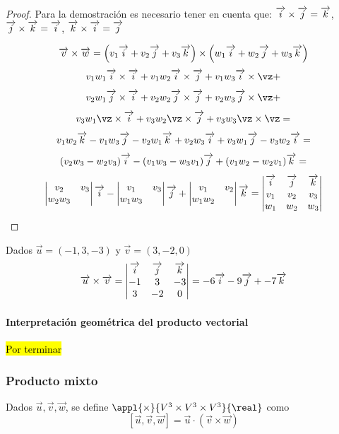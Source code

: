 \begin{proof}

Para la demostración es necesario tener en cuenta que: $\overrightarrow{i}\times\overrightarrow{j}=\overrightarrow{k}$, $\overrightarrow{j}\times\overrightarrow{k}=\overrightarrow{i}$, $\overrightarrow{k}\times\overrightarrow{i}=\overrightarrow{j}$

\[
\overrightarrow{v}\times\overrightarrow{w} = \left(v_1\overrightarrow{i}+v_2\overrightarrow{j}+v_3\overrightarrow{k}\right)\times\left(w_1\overrightarrow{i}+w_2\overrightarrow{j}+w_3\overrightarrow{k}\right)\]
\[
v_1w_1\vi\times\vi+v_1w_2\vi\times\vj+v_1w_3\vi\times\vz+\]\[
v_2w_1\vj\times\vi+v_2w_2\vj\times\vj+v_2w_3\vj\times\vz+\]\[
v_3w_1\vz\times\vi+v_3w_2\vz\times\vj+v_3w_3\vz\times\vz=
\]
\[
v_1w_2\overrightarrow{k}-v_1w_3\overrightarrow{j}-v_2w_1\overrightarrow{k}+v_2w_3\overrightarrow{i}+v_3w_1\overrightarrow{j}-v_3w_2\overrightarrow{i} = \]\[
(v_2w_3-w_2v_3)\overrightarrow{i} -(v_1w_3-w_3v_1)\overrightarrow{j}+ (v_1w_2-w_2v_1)\overrightarrow{k} = 
\]
\[
\left|\begin{matrix}v_2&v_3\\w_2w_3\end{matrix}\right|\overrightarrow{i} - 
\left|\begin{matrix}v_1&v_3\\w_1w_3\end{matrix}\right|\overrightarrow{j} +
\left|\begin{matrix}v_1&v_2\\w_1w_2\end{matrix}\right|\overrightarrow{k} = \left|\begin{matrix}\overrightarrow{i}&\overrightarrow{j}&\overrightarrow{k}\\v_1&v_2&v_3\\w_1&w_2&w_3\end{matrix}\right|
\]
\end{proof}


\begin{example}
Dados $\vec{u}=(-1,3,-3)$ y $\vec{v} = (3,-2,0)$
\[
\vec{u}\times\vec{v} = \crossprod{-1}{3}{-3}{3}{-2}{0} =\crossprodcalc{-1}{3}{-3}{3}{-2}{0}
\]
\end{example}

\paragraph{Interpretación geométrica del producto vectorial}

\hl{Por terminar}

\subsubsection{Producto mixto}
\begin{defn}
Dados $\vec{u},\vec{v},\vec{w}$, se define $\appl{\times}{V^3\times V^3\times V^3}{\real}$ como 
\[\left[\vec{u},\vec{v},\vec{w}\right] = \vec{u}·\left(\vec{v}\times\vec{w}\right)\]
\end{defn}

